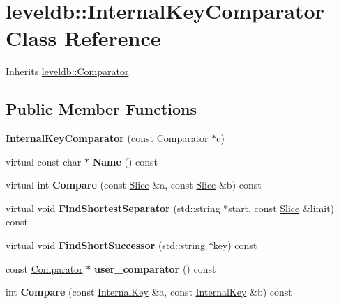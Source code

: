 \hypertarget{classleveldb_1_1_internal_key_comparator}{}\section{leveldb\+::Internal\+Key\+Comparator Class Reference}
\label{classleveldb_1_1_internal_key_comparator}


Inherits \mbox{\hyperlink{structleveldb_1_1_comparator}{leveldb\+::\+Comparator}}.

\subsection*{Public Member Functions}
\begin{DoxyCompactItemize}
\item 
\mbox{\label{classleveldb_1_1_internal_key_comparator_a0069a8b4828f592da66937e2c3471080}} 
{\bfseries Internal\+Key\+Comparator} (const \mbox{\hyperlink{structleveldb_1_1_comparator}{Comparator}} $\ast$c)
\item 
\mbox{\label{classleveldb_1_1_internal_key_comparator_ae8848b098c0c20071aa93a166b80de0d}} 
virtual const char $\ast$ {\bfseries Name} () const
\item 
\mbox{\label{classleveldb_1_1_internal_key_comparator_a8ee088d285165f692f2f03ac5b3e13b1}} 
virtual int {\bfseries Compare} (const \mbox{\hyperlink{classleveldb_1_1_slice}{Slice}} \&a, const \mbox{\hyperlink{classleveldb_1_1_slice}{Slice}} \&b) const
\item 
\mbox{\label{classleveldb_1_1_internal_key_comparator_a876984ae99b1404b4074be4d92cab421}} 
virtual void {\bfseries Find\+Shortest\+Separator} (std\+::string $\ast$start, const \mbox{\hyperlink{classleveldb_1_1_slice}{Slice}} \&limit) const
\item 
\mbox{\label{classleveldb_1_1_internal_key_comparator_a221a28a524474834b2cba5c3be84cb13}} 
virtual void {\bfseries Find\+Short\+Successor} (std\+::string $\ast$key) const
\item 
\mbox{\label{classleveldb_1_1_internal_key_comparator_ac8c5db699e5defed74c6b17ddadf90f8}} 
const \mbox{\hyperlink{structleveldb_1_1_comparator}{Comparator}} $\ast$ {\bfseries user\+\_\+comparator} () const
\item 
\mbox{\label{classleveldb_1_1_internal_key_comparator_a715d8e2eb246df39248ce54789fb4621}} 
int {\bfseries Compare} (const \mbox{\hyperlink{classleveldb_1_1_internal_key}{Internal\+Key}} \&a, const \mbox{\hyperlink{classleveldb_1_1_internal_key}{Internal\+Key}} \&b) const
\end{DoxyCompactItemize}


